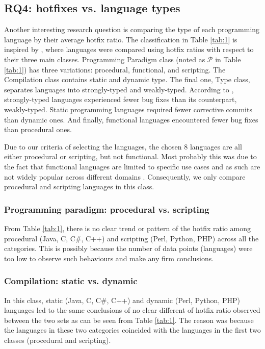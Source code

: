 \documentclass{sig-alternate}
\begin{document}
\subsection{RQ4: hotfixes vs. language types}
Another interesting research question is comparing the type of each programming language by their average hotfix ratio. The classification in Table \ref{tab:1} is inspired by \cite{Ray2014}, where languages were compared using hotfix ratios with respect to their three main classes. Programming Paradigm class (noted as $\mathcal{P}$ in Table \ref{tab:1}) has three variations: procedural, functional, and scripting. The Compilation class contains static and dynamic type. The final one, Type class, separates languages into strongly-typed and weakly-typed. According to \cite{Ray2014}, strongly-typed languages experienced fewer bug fixes than its counterpart, weakly-typed. Static programming languages required fewer corrective commits than dynamic ones. And finally, functional languages encountered fewer bug fixes than procedural ones.

Due to our criteria of selecting the languages, the chosen 8 languages are all either procedural or scripting, but not functional. Most probably this was due to the fact that functional languages are limited to specific use cases and as such are not widely popular across different domains  \cite{Wadler1999}. Consequently, we only compare procedural and scripting languages in this class.

\subsubsection*{Programming paradigm: procedural vs. scripting}
From Table \ref{tab:1}, there is no clear trend or pattern of the hotfix ratio among procedural (Java, C, C\#, C++) and scripting (Perl, Python, PHP) across all the categories. This is possibly because the number of data points (languages) were too low to observe such behaviours and make any firm conclusions. %

\subsubsection*{Compilation: static vs. dynamic}
In this class, static (Java, C, C\#, C++) and dynamic (Perl, Python, PHP) languages led to the same conclusions of no clear different of hotfix ratio observed between the two sets as can be seen from Table \ref{tab:1}. The reason was because the languages in these two categories coincided with the languages in the first two classes (procedural and scripting).
\end{document}
